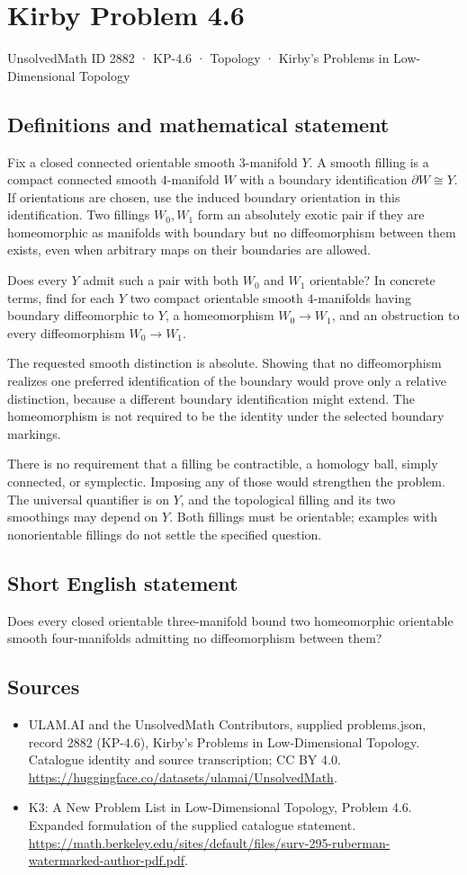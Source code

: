 \documentclass[11pt,a4paper]{article}
\begin{document}
\section*{Kirby Problem 4.6}\label{2882}
{\small UnsolvedMath ID 2882 · KP-4.6 · Topology · Kirby's Problems in Low-Dimensional Topology}
\subsection{Definitions and mathematical statement}
Fix a closed connected orientable smooth $3$-manifold $Y$.
A smooth filling is a compact connected smooth $4$-manifold $W$ with
a boundary identification $\partial W\cong Y$. If orientations are
chosen, use the induced boundary orientation in this identification.
Two fillings $W_0,W_1$ form an absolutely exotic pair if they are
homeomorphic as manifolds with boundary but no diffeomorphism between
them exists, even when arbitrary maps on their boundaries are allowed.

Does every $Y$ admit such a pair with both $W_0$ and $W_1$
orientable? In concrete terms, find for each $Y$ two compact orientable
smooth $4$-manifolds having boundary diffeomorphic to $Y$, a homeomorphism
$W_0\to W_1$, and an obstruction to every diffeomorphism
$W_0\to W_1$.

The requested smooth distinction is absolute. Showing that no
diffeomorphism realizes one preferred identification of the boundary
would prove only a relative distinction, because a different boundary
identification might extend. The homeomorphism is not required to be
the identity under the selected boundary markings.

There is no requirement that a filling be contractible, a homology
ball, simply connected, or symplectic. Imposing any of those would
strengthen the problem. The universal quantifier is on $Y$, and the
topological filling and its two smoothings may depend on $Y$.
Both fillings must be orientable; examples with nonorientable fillings
do not settle the specified question.
\subsection{Short English statement}
Does every closed orientable three-manifold bound two homeomorphic orientable smooth four-manifolds admitting no diffeomorphism between them?
\subsection{Sources}
\begin{itemize}
\item[S1] ULAM.AI and the UnsolvedMath Contributors, supplied problems.json, record 2882 (KP-4.6), Kirby's Problems in Low-Dimensional Topology. Catalogue identity and source transcription; CC BY 4.0.
\url{https://huggingface.co/datasets/ulamai/UnsolvedMath}.
\item[S2] K3: A New Problem List in Low-Dimensional Topology, Problem 4.6. Expanded formulation of the supplied catalogue statement.
\url{https://math.berkeley.edu/sites/default/files/surv-295-ruberman-watermarked-author-pdf.pdf}.
\end{itemize}
\end{document}
